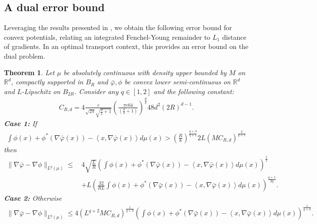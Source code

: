 \documentclass[11pt]{article}
\newtheorem{theorem}[lemma]{Theorem}
\newcommand{\RR}{\mathbb{R}}
\newcommand{\1}{\mathbbm{1}}
\numberwithin{equation}{section}
\begin{document}
\subsection{A dual error bound}
Leveraging the results presented in , we obtain the following error bound for convex potentials, relating an integrated Fenchel-Young remainder to $L_1$ distance of gradients. In an optimal transport context, this provides an error bound on the dual problem.

\begin{theorem}
Let $\mu$ be absolutely continuous with density upper bounded by $M$ on $\RR^d$, compactly supported in $B_R$ and $\bar{\varphi},\phi$ be convex lower semi-continuous on $\RR^d$ and $L$-Lipschitz on $B_{2R}$.
	Consider any $q \in [1,2]$ and the following constant:
	\begin{align*}
		C_{R,d} = 4 \frac{e}{\sqrt{2\pi} \sqrt{\frac{d}{2} + 1}}\left(\frac{\pi e 64}{\left( \frac{d}{2} + 1 \right)} \right)^{\frac{d}{2}}  48d^2 (2R)^{d-1}.
	\end{align*}
	\textbf{Case 1:} If
	\begin{align*}
		\int \phi(x) + \phi^*(\nabla \bar{\varphi}(x)) - \left\langle x, \nabla \bar{\varphi}(x) \right\rangle  d\mu(x) > \left(\frac{R}{8}\right)^{\frac{q+3}{q+1}} 2L (MC_{R,d})^{\frac{2}{q+1}}
	\end{align*}
	then
	\begin{align*}
		\| \nabla \bar{\varphi} - \nabla \phi\|_{L^q(\mu)}
		\leq\,&  4 \sqrt{\frac{L}{R}} \left( \int \phi(x) + \phi^*(\nabla \bar{\varphi}(x)) - \left\langle x, \nabla \bar{\varphi}(x) \right\rangle  d\mu(x)  \right)^\frac{1}{2} \\ &+ L\left(\frac{32 }{RL} \int \phi(x) + \phi^*(\nabla \bar{\varphi}(x)) - \left\langle x, \nabla \bar{\varphi}(x) \right\rangle  d\mu(x)\right)^{\frac{q+1}{2q}}.
	\end{align*}
	\textbf{Case 2:} Otherwise
	\begin{align*}
		\| \nabla \bar{\varphi} - \nabla \phi\|_{L^q(\mu)}
		\leq 4\left(L^{q+2}MC_{R,d} \right)^{\frac{1}{q+3}} \left( \int \phi(x) + \phi^*(\nabla \bar{\varphi}(x)) - \left\langle x, \nabla \bar{\varphi}(x) \right\rangle  d\mu(x) \right)^{\frac{1}{q+3}}.
	\end{align*}
	\label{th:dualErrorBound}
\end{theorem}
\end{document}
